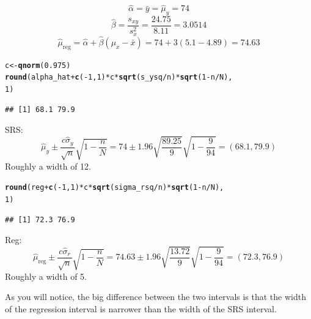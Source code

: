 \documentclass[oneside]{book}\usepackage[]{graphicx}\usepackage[dvipsnames,table,xcdraw]{xcolor}
\makeatletter
\newcommand{\hlnum}[1]{\textcolor[rgb]{0.686,0.059,0.569}{#1}}%
\newcommand{\hlopt}[1]{\textcolor[rgb]{0,0,0}{#1}}%
\newcommand{\hlstd}[1]{\textcolor[rgb]{0.345,0.345,0.345}{#1}}%
\newcommand{\hlkwb}[1]{\textcolor[rgb]{0.69,0.353,0.396}{#1}}%
\newcommand{\hlkwd}[1]{\textcolor[rgb]{0.737,0.353,0.396}{\textbf{#1}}}%
\newenvironment{kframe}{%
 \def\at@end@of@kframe{}%
 \ifinner\ifhmode%
  \def\at@end@of@kframe{\end{minipage}}%
  \begin{minipage}{\columnwidth}%
 \fi\fi%
 \def\FrameCommand##1{\hskip\@totalleftmargin \hskip-\fboxsep
 \colorbox{shadecolor}{##1}\hskip-\fboxsep
     \hskip-\linewidth \hskip-\@totalleftmargin \hskip\columnwidth}%
 \MakeFramed {\advance\hsize-\width
   \@totalleftmargin\z@ \linewidth\hsize
   \@setminipage}}%
 {\par\unskip\endMakeFramed%
 \at@end@of@kframe}
\newenvironment{knitrout}{}{} %
\makeatother
\begin{document}
$$\hat{\alpha}=\bar{y}=\hat{\mu}_y=74$$
$$\hat{\beta}=\frac{s_{xy}}{s_x^2}=\frac{24.75}{8.11}=3.0514$$
$$\hat{\mu}_{\text{reg}}=\hat{\alpha}+\hat{\beta}(\mu_x-\bar{x})=74+3(5.1-4.89)=74.63$$
\begin{knitrout}
\color{fgcolor}\begin{kframe}
\begin{alltt}
\hlstd{c} \hlkwb{<-} \hlkwd{qnorm}\hlstd{(}\hlnum{0.975}\hlstd{)}
\hlkwd{round}\hlstd{(alpha_hat} \hlopt{+} \hlkwd{c}\hlstd{(}\hlopt{-}\hlnum{1}\hlstd{,} \hlnum{1}\hlstd{)} \hlopt{*} \hlstd{c} \hlopt{*} \hlkwd{sqrt}\hlstd{(s_ysq}\hlopt{/}\hlstd{n)} \hlopt{*} \hlkwd{sqrt}\hlstd{(}\hlnum{1} \hlopt{-} \hlstd{n}\hlopt{/}\hlstd{N),}
  \hlnum{1}\hlstd{)}
\end{alltt}
\begin{verbatim}
## [1] 68.1 79.9
\end{verbatim}
\end{kframe}
\end{knitrout}
SRS:
$$\hat{\mu}_y \pm \frac{c\hat{\sigma}_y}{\sqrt{n}}\sqrt{1-\frac{n}{N}}=
    74\pm 1.96\sqrt{\frac{89.25}{9}}\sqrt{1-\frac{9}{94}}=(68.1,79.9)$$
Roughly a width of 12.
\begin{knitrout}
\color{fgcolor}\begin{kframe}
\begin{alltt}
\hlkwd{round}\hlstd{(reg} \hlopt{+} \hlkwd{c}\hlstd{(}\hlopt{-}\hlnum{1}\hlstd{,} \hlnum{1}\hlstd{)} \hlopt{*} \hlstd{c} \hlopt{*} \hlkwd{sqrt}\hlstd{(sigma_rsq}\hlopt{/}\hlstd{n)} \hlopt{*} \hlkwd{sqrt}\hlstd{(}\hlnum{1} \hlopt{-} \hlstd{n}\hlopt{/}\hlstd{N),}
  \hlnum{1}\hlstd{)}
\end{alltt}
\begin{verbatim}
## [1] 72.3 76.9
\end{verbatim}
\end{kframe}
\end{knitrout}
Reg:
$$\hat{\mu}_{\text{reg}}\pm \frac{c\hat{\sigma}_r}{\sqrt{n}}\sqrt{1-\frac{n}{N}}
    = 74.63\pm 1.96\sqrt{\frac{13.72}{9}}\sqrt{1-\frac{9}{94}}=(72.3,76.9)$$
Roughly a width of 5.

As you will notice, the big difference between the two intervals
is that the width of the regression interval is
narrower than the width of the SRS interval.


\end{document}
